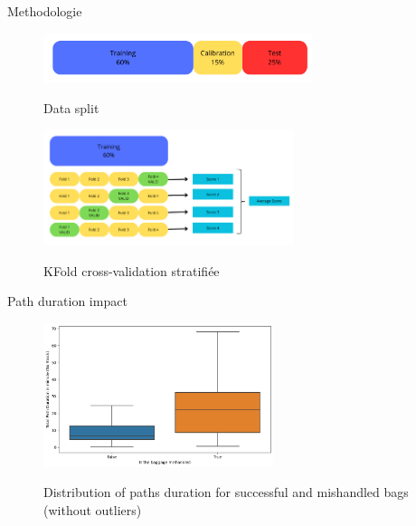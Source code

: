 \documentclass{beamer}
\begin{document}
\begin{frame}{Methodologie}
\begin{figure}[h]
    \centering
    \includegraphics[width=0.7\textwidth]{Data splitting.png}\\
    \caption{Data split}
    \label{fig:Data split}
\end{figure}
\begin{figure}[h]
    \centering
    \includegraphics[width=0.65\textwidth]{KFold data.png}\\
    \caption{KFold cross-validation stratifiée}
    \label{fig:KFold cross-validation}
\end{figure}
\end{frame}



\begin{frame}{Path duration impact}
    \begin{figure}[h]
        \centering
        \includegraphics[width=0.6\textwidth]{Boxplot path duration per failed status.png}\\
        \caption{Distribution of paths duration for successful and mishandled bags (without outliers)}
        \label{fig:Distribution of paths duration for non-failed and failed bags}
    \end{figure}
\end{frame}
\end{document}
